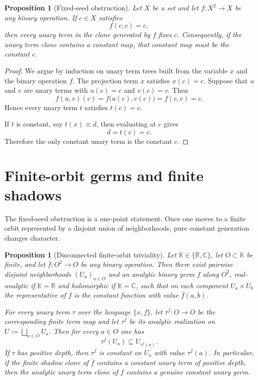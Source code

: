 \documentclass[11pt]{amsart}
\numberwithin{equation}{section}
\newtheorem{proposition}[theorem]{Proposition}
\theoremstyle{remark}
\theoremstyle{definition}
\newcommand{\C}{\mathbb{C}}
\newcommand{\R}{\mathbb{R}}
\newcommand{\K}{\mathbb{K}}
\begin{document}
\begin{proposition}[Fixed-seed obstruction]\label{prop:fixed-seed}
Let $X$ be a set and let $f\colon X^2\to X$ be any binary operation. If $c\in X$ satisfies
\[
f(c,c)=c,
\]
then every unary term in the clone generated by $f$ fixes $c$. Consequently, if the unary term clone contains a constant map, that constant map must be the constant $c$.
\end{proposition}

\begin{proof}
We argue by induction on unary term trees built from the variable $x$ and the binary operation $f$. The projection term $x$ satisfies $x(c)=c$. Suppose that $u$ and $v$ are unary terms with $u(c)=c$ and $v(c)=c$. Then
\[
f(u,v)(c)=f\bigl(u(c),v(c)\bigr)=f(c,c)=c.
\]
Hence every unary term $t$ satisfies $t(c)=c$.

If $t$ is constant, say $t(x)\equiv d$, then evaluating at $c$ gives
\[
d=t(c)=c.
\]
Therefore the only constant unary term is the constant $c$.
\end{proof}

\section{Finite-orbit germs and finite shadows}\label{sec:finite-orbits}

The fixed-seed obstruction is a one-point statement. Once one moves to a finite orbit represented by a disjoint union of neighborhoods, pure constant generation changes character.

\begin{proposition}[Disconnected finite-orbit triviality]\label{prop:finite-orbit-triviality}
Let $\K\in\{\R,\C\}$, let $O\subset \K$ be finite, and let $\bar f\colon O^2\to O$ be any binary operation. Then there exist pairwise disjoint neighborhoods $(U_a)_{a\in O}$ and an analytic binary germ $f$ along $O^2$, real-analytic if $\K=\R$ and holomorphic if $\K=\C$, such that on each component $U_a\times U_b$ the representative of $f$ is the constant function with value $\bar f(a,b)$.

For every unary term $\tau$ over the language $\{x,f\}$, let $\tau^{\bar f}\colon O\to O$ be the corresponding finite term map and let $\tau^f$ be its analytic realization on $U:=\bigsqcup_{a\in O} U_a$. Then for every $a\in O$ one has
\[
\tau^f(U_a)\subseteq U_{\tau^{\bar f}(a)}.
\]
If $\tau$ has positive depth, then $\tau^f$ is constant on $U_a$ with value $\tau^{\bar f}(a)$. In particular, if the finite shadow clone of $\bar f$ contains a constant unary term of positive depth, then the analytic unary term clone of $f$ contains a genuine constant unary germ.
\end{proposition}
\end{document}
